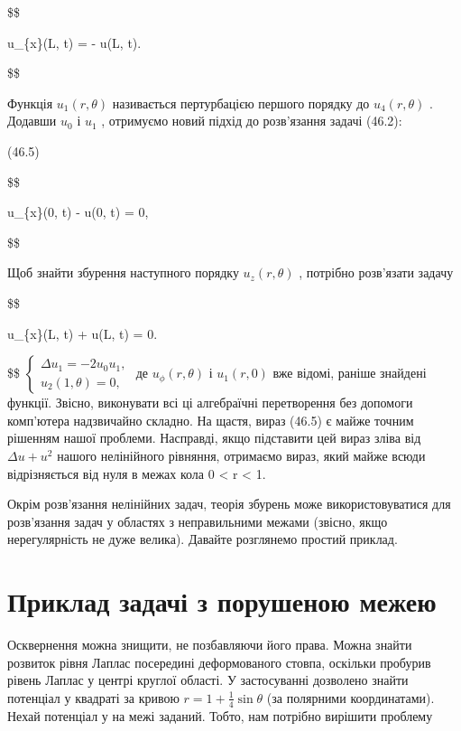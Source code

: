 \documentclass[
  ukrainian,
]{article}
\begin{document}
\$\$

u\_\{x\}(L, t) = - u(L, t).

\$\$

Функція \(u_1(r, \theta)\) називається пертурбацією першого порядку до
\(u_4(r, \theta)\) . Додавши \(u_0\) і \(u_1\) , отримуємо новий підхід
до розв'язання задачі (46.2):

(46.5)

\$\$

u\_\{x\}(0, t) - u(0, t) = 0,

\$\$

Щоб знайти збурення наступного порядку \(u_{z}(r, \theta)\) , потрібно
розв'язати задачу

\$\$

u\_\{x\}(L, t) + u(L, t) = 0.

\$\$
\(\begin{cases} \Delta u_{1} = -2u_{0}u_{1}, \\ u_{2}(1, \theta) = 0, \end{cases}\)
де \(u_{\phi}(r,\theta)\) і \(u_{1}(r,0)\) вже відомі, раніше знайдені
функції. Звісно, виконувати всі ці алгебраїчні перетворення без допомоги
комп'ютера надзвичайно складно. На щастя, вираз (46.5) є майже точним
рішенням нашої проблеми. Насправді, якщо підставити цей вираз зліва від
\(\Delta u + u^{2}\) нашого нелінійного рівняння, отримаємо вираз, який
майже всюди відрізняється від нуля в межах кола 0 \textless{} r
\textless{} 1.

Окрім розв'язання нелінійних задач, теорія збурень може
використовуватися для розв'язання задач у областях з неправильними
межами (звісно, якщо нерегулярність не дуже велика). Давайте розглянемо
простий приклад.

\section{Приклад задачі з порушеною
межею}\label{ux43fux440ux438ux43aux43bux430ux434-ux437ux430ux434ux430ux447ux456-ux437-ux43fux43eux440ux443ux448ux435ux43dux43eux44e-ux43cux435ux436ux435ux44e}

Осквернення можна знищити, не позбавляючи його права. Можна знайти
розвиток рівня Лаплас посередині деформованого стовпа, оскільки пробурив
рівень Лаплас у центрі круглої області. У застосуванні дозволено знайти
потенціал у квадраті за кривою \(r=1+\frac{1}{4}\sin\theta\) (за
полярними координатами). Нехай потенціал у на межі заданий. Тобто, нам
потрібно вирішити проблему
\end{document}
